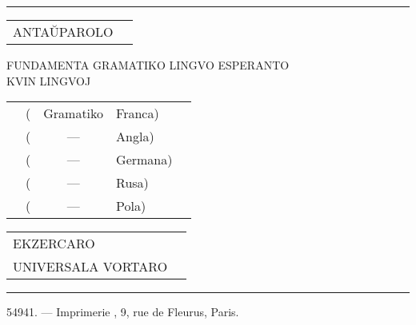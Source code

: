 %
%
\begin{center}
\thispagestyle{plain}
\end{center}
{\setlength{\parindent}{0pt}

{\centering \rule{13mm}{0.4pt}\par}

{\small
\begin{flushright}
\begin{tabu} to 
ANTAŬPAROLO \dotfill & \pageref{antau} \\
\end{tabu}
\end{flushright}

\vspace{1em}

{\centering
FUNDAMENTA GRAMATIKO  LINGVO ESPERANTO \\
 KVIN LINGVOJ\par}

\vspace{1em}

\begin{flushright}
\begin{tabu} to 0.9
 & ( & Gramatiko & Franca) \dotfill & \pageref{gram:franca} \\
 & ( & — & Angla) \dotfill & \pageref{gram:angla} \\
 & ( & — & Germana) \dotfill & \pageref{gram:germana} \\
 & ( & — & Rusa) \dotfill & \pageref{gram:rusa} \\
 & ( & — & Pola) \dotfill & \pageref{gram:pola} \\
\end{tabu}
\end{flushright}

\begin{flushright}
\begin{tabu} to 
EKZERCARO \dotfill & \pageref{ekzercaro} \\
UNIVERSALA VORTARO \dotfill & \pageref{vortaro} \\
\end{tabu}
\end{flushright}

} %
} %

\vspace*{\fill}

\begin{center}
\rule{0.3\textwidth}{0.4pt}

\scriptsize 54941. — Imprimerie , 9, rue de Fleurus, Paris.
\end{center}

\vspace*{\fill}
